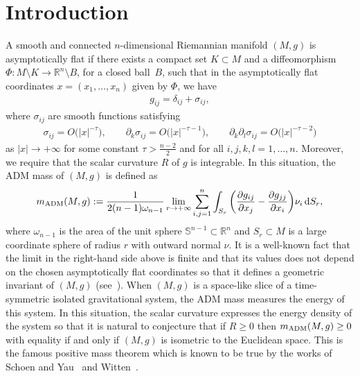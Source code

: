 \documentclass[pdftex]{sigma}
\numberwithin{equation}{section}
\begin{document}
\renewcommand{\thefootnote}{\arabic{footnote}}
\setcounter{footnote}{0}

\section{Introduction}

A smooth and connected $n$-dimensional Riemannian manifold $(M,g)$ is asymptotically flat if there exists a compact set $K\subset M$ and a diffeomorphism $\Phi\colon M\setminus K\rightarrow\mathbb{R}^n\setminus B$, for a closed ball~$B$, such that in the asymptotically flat coordinates $x=(x_1,\dots,x_n)$ given by $\Phi$, we have
\begin{gather*}%
g_{ij}=\delta_{ij}+\sigma_{ij},
\end{gather*}
where $\sigma_{ij}$ are smooth functions satisfying
\begin{gather*}
\sigma_{ij}=O\big(|x|^{-\tau}\big),\qquad
\partial_k\sigma_{ij}=O\big(|x|^{-\tau-1}\big),\qquad
\partial_k\partial_l\sigma_{ij}=O\big(|x|^{-\tau-2}\big)
\end{gather*}
as $|x|\rightarrow+\infty$ for some constant $\tau>\frac{n-2}{2}$ and for all $i,j,k,l=1,\dots,n$. Moreover, we require that the scalar curvature $R$ of $g$ is integrable. In this situation, the ADM mass of $(M,g)$ is defined as
\begin{gather*}
m_{\rm ADM}(M,g):=\frac{1}{2(n-1)\omega_{n-1}}\lim_{r\rightarrow+\infty}
\sum_{i,j=1}^n\int_{S_r}\bigg(\frac{\partial g_{ij}}{\partial x_j}-\frac{\partial g_{jj}}{\partial x_i}\bigg)\nu_i\,{\rm d}S_r,
\end{gather*}
where $\omega_{n-1}$ is the area of the unit sphere $\mathbb{S}^{n-1}\subset\mathbb{R}^n$ and $S_r\subset M$ is a large coordinate sphere of radius $r$ with outward normal $\nu$. It is a well-known fact that the limit in the right-hand side above is finite and that its values does not depend on the chosen asymptotically flat coordinates so that it defines a geometric invariant of $(M,g)$ (see~\cite{Bartnik1,Chrusciel1}). When $(M,g)$ is a space-like slice of a time-symmetric isolated gravitational system, the ADM mass measures the energy of this system. In this situation, the scalar curvature expresses the energy density of the system so that it is natural to conjecture that if $R\geq 0$ then $m_{\rm ADM}(M,g)\geq 0$ with equality if and only if $(M,g)$ is isometric to the Euclidean space. This is the famous positive mass theorem which is known to be true by the works of Schoen and Yau~\cite{SchoenYau5,SchoenYau3} and Witten~\cite{Witten1}.
\end{document}
